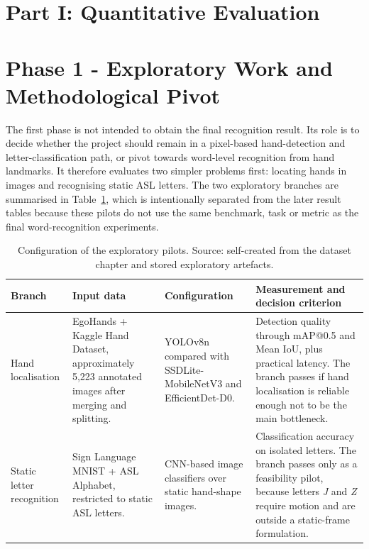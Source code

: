 \section*{Part I: Quantitative Evaluation}

\section{Phase 1 - Exploratory Work and Methodological Pivot}
\label{sec:exp_phase1}

The first phase is not intended to obtain the final recognition result. Its role is to decide
whether the project should remain in a pixel-based hand-detection and letter-classification path,
or pivot towards word-level recognition from hand landmarks. It therefore evaluates two simpler
problems first: locating hands in images and recognising static ASL letters. The two exploratory
branches are summarised in Table~\ref{tab:exp_phase1_config}, which is intentionally separated from
the later result tables because these pilots do not use the same benchmark, task or metric as the
final word-recognition experiments.

\begin{table}[!htbp]
    \centering
    \small
    \renewcommand{\arraystretch}{1.25}
    \caption{Configuration of the exploratory pilots. Source: self-created from the dataset chapter and stored exploratory artefacts.}
    \label{tab:exp_phase1_config}
    \begin{tabularx}{\linewidth}{@{}>{\RaggedRight\arraybackslash}p{2.6cm} >{\RaggedRight\arraybackslash}X >{\RaggedRight\arraybackslash}X >{\RaggedRight\arraybackslash}X@{}}
        \toprule
        \textbf{Branch}           & \textbf{Input data}                                                                                 & \textbf{Configuration}                                         & \textbf{Measurement and decision criterion}                                                                                                                                                  \\
        \midrule
        Hand localisation         & EgoHands + Kaggle Hand Dataset, approximately 5{,}223 annotated images after merging and splitting. & YOLOv8n compared with SSDLite-MobileNetV3 and EfficientDet-D0. & Detection quality through mAP@0.5 and Mean IoU, plus practical latency. The branch passes if hand localisation is reliable enough not to be the main bottleneck.                             \\
        Static letter recognition & Sign Language MNIST + ASL Alphabet, restricted to static ASL letters.                               & CNN-based image classifiers over static hand-shape images.     & Classification accuracy on isolated letters. The branch passes only as a feasibility pilot, because letters \emph{J} and \emph{Z} require motion and are outside a static-frame formulation. \\
        \bottomrule
    \end{tabularx}
\end{table}

